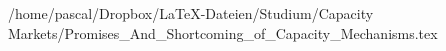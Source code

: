 /home/pascal/Dropbox/LaTeX-Dateien/Studium/Capacity Markets/Promises_And_Shortcoming_of_Capacity_Mechanisms.tex